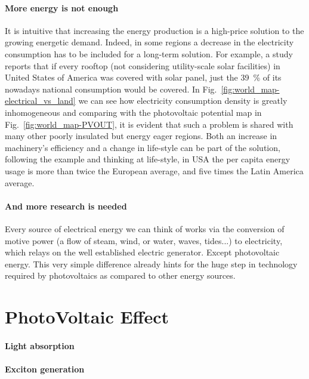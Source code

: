  \paragraph{More energy is not enough} It is intuitive that increasing the energy production is a high-price solution to the growing energetic demand.
 Indeed, in some regions a decrease in the electricity consumption has to be included for a long-term solution.
 For example, a study\cite{Margolis2016} reports that if every rooftop (not considering utility-scale solar facilities) in United States of America was covered with solar panel, just the 39~\% of its nowadays national consumption would be covered.
 In Fig.~\ref{fig:world_map-electrical_vs_land} we can see how electricity consumption density is greatly inhomogeneous and comparing with the photovoltaic potential map in Fig.~\ref{fig:world_map-PVOUT}, it is evident that such a problem is shared with many other poorly insulated but energy eager regions.
 Both an increase in machinery's efficiency and a change in life-style can be part of the solution, following the example and thinking at life-style, in USA the per capita energy usage is more than twice the European average, and five times the Latin America average.\cite{IEA}
 
 \paragraph{And more research is needed} Every source of electrical energy we can think of works via the conversion of motive power (a flow of steam, wind, or water, waves, tides...) to electricity, which relays on the well established electric generator. Except photovoltaic energy. This very simple difference already hints for the huge step in technology required by photovoltaics as compared to other energy sources.

\section{PhotoVoltaic Effect}

 \paragraph{Light absorption} 

 \paragraph{Exciton generation} 
 
